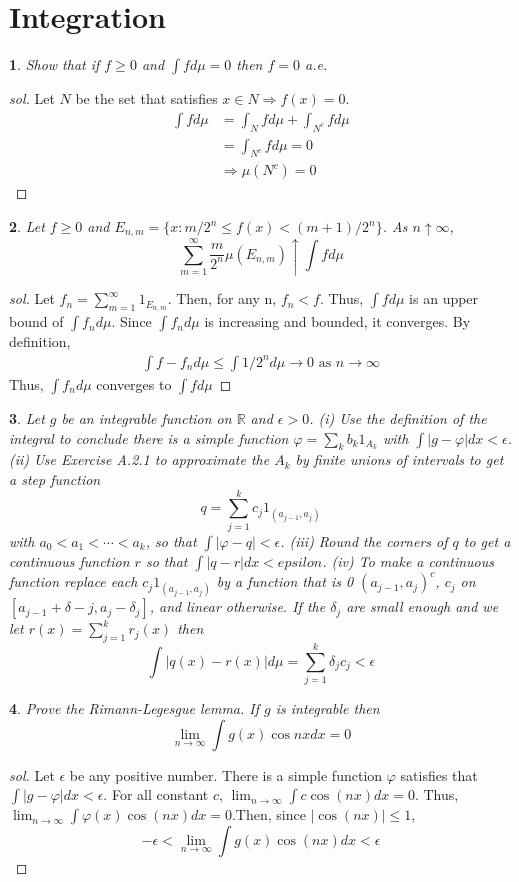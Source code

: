 \documentclass{report}
\newtheorem{ex}{}[section]
\begin{document}
\section{Integration}
\begin{ex}
Show that if $f \ge 0$ and $\int f d\mu = 0$ then $f = 0$ a.e.
\end{ex}
\begin{proof}[sol]
Let $N$ be the set that satisfies $x \in N \Rightarrow f(x) = 0$.
\begin{align*}
    \int f d\mu &=  \int_N f d\mu  + \int_{N^c} f d\mu\\
    &= \int_{N^c} f d\mu = 0\\
    &\Rightarrow \mu(N^c) = 0
\end{align*}
\end{proof}
\begin{ex}
Let $f \ge 0$ and $E_{n,m} = \{x : m/2^n \le f(x) < (m+1)/2^n\}$. As $n \uparrow \infty$,
\[\sum_{m=1}^\infty \frac{m}{2^n} \mu(E_{n,m}) \uparrow \int f d\mu\]
\end{ex}
\begin{proof}[sol]
Let $f_n = \sum_{m=1}^\infty 1_{E_{n,m}}$. Then, for any n, $f_n < f$. Thus, $\int f d\mu$ is an upper bound of $\int f_n d\mu$. Since $\int f_n d\mu$ is increasing and bounded, it converges. By definition,
\begin{align*}
    \int f -f_n d\mu \le \int 1/2^n d\mu \to 0 \text{ as } n \to \infty
\end{align*}
Thus, $\int f_n d\mu$ converges to $\int f d\mu$
\end{proof}
\begin{ex}
Let $g$ be an integrable function on $\mathbb{R}$ and $\epsilon > 0$. (i) Use the definition of the integral to conclude there is a simple function $\varphi = \sum_k b_k1_{A_k}$ with $\int |g - \varphi| dx < \epsilon$. (ii) Use Exercise A.2.1 to approximate the $A_k$ by finite unions of intervals to get a step function
\[q = \sum_{j=1}^k c_j 1_{(a_{j-1}, a_j)}\]
with $a_0 < a_1 < \dotsb < a_k$, so that $\int |\varphi-q| < \epsilon$. (iii) Round the corners of $q$ to get a continuous function $r$ so that $\int |q - r| dx < epsilon$.
(iv) To make a continuous function replace each $c_j1_{(a_{j-1},a_j)}$ by a function
that is 0 $(a_{j-1}, a_j)^c$, $c_j$ on $[a_{j-1} + \delta - j, a_j - \delta_j ]$, and linear otherwise. If the $\delta_j$ are small enough and we let $r(x) = \sum^k_{j=1} r_j(x)$ then
\[\int |q(x) - r(x)|d\mu = \sum_{j=1}^k \delta_j c_j <\epsilon\]
\end{ex}
\begin{ex}
Prove the Rimann-Legesgue lemma. If $g$ is integrable then
\[\lim_{n\to\infty} \int g(x) \cos nx dx  = 0\]
\end{ex}
\begin{proof}[sol]
Let $\epsilon$ be any positive number. There is a simple function $\varphi$ satisfies that $\int|g - \varphi|dx < \epsilon$. For all constant $c$, $\lim_{n\to\infty}\int c\cos(nx)dx = 0$. Thus, $\lim_{n\to\infty}\int \varphi(x)\cos(nx)dx = 0$.Then, since $|\cos(nx)| \le 1$,
\[-\epsilon < \lim_{n\to\infty}\int g(x)\cos(nx)dx <\epsilon\]
\end{proof}
\end{document}
